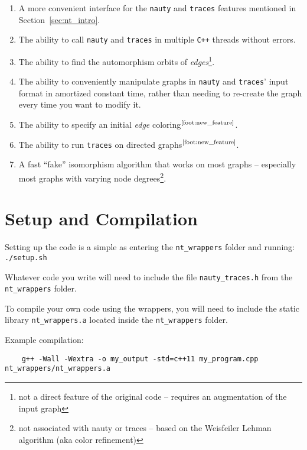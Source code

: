 \documentclass{article}
\begin{document}
\begin{enumerate}
    \item A more convenient interface for the \verb|nauty| and \verb|traces| features mentioned in Section~\ref{sec:nt_intro}.
    \item The ability to call \verb|nauty| and \verb|traces| in multiple \verb|C++| threads without errors.
    \item The ability to find the automorphism orbits of \emph{edges}\footnote{not a direct feature of the original code -- requires an augmentation of the input graph\label{foot:new_feature}}.
    \item The ability to conveniently manipulate graphs in \verb|nauty| and \verb|traces|' input format in amortized constant time, rather than needing to re-create the graph every time you want to modify it.
    \item The ability to specify an initial \emph{edge} coloring$^\text{\ref{foot:new_feature}}$.
    \item The ability to run \verb|traces| on directed graphs$^\text{\ref{foot:new_feature}}$.
    \item A fast ``fake'' isomorphism algorithm that works on most graphs -- especially most graphs with varying node degrees\footnote{not associated with nauty or traces -- based on the Weisfeiler Lehman algorithm (aka color refinement)}.
\end{enumerate}

\newpage

\section{Setup and Compilation}\label{sec:setup}

Setting up the code is a simple as entering the \verb|nt_wrappers| folder and running: \verb|./setup.sh|

Whatever code you write will need to include the file \verb|nauty_traces.h| from the \verb|nt_wrappers| folder.

To compile your own code using the wrappers, you will need to include the static library \verb|nt_wrappers.a| located inside the \verb|nt_wrappers| folder.

Example compilation:

\begin{verbatim}
    g++ -Wall -Wextra -o my_output -std=c++11 my_program.cpp nt_wrappers/nt_wrappers.a
\end{verbatim}
\end{document}
